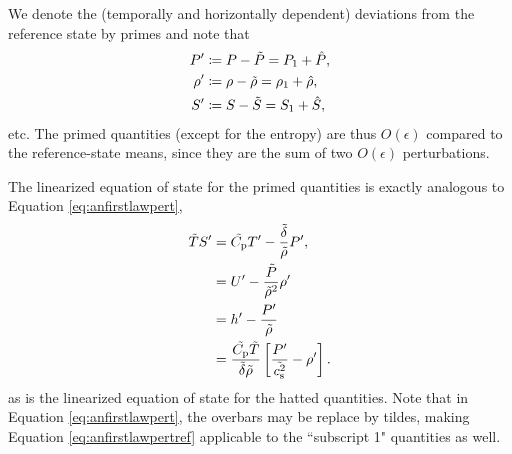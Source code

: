 \documentclass[12pt]{article}
\begin{document}
We denote the (temporally and horizontally dependent) deviations from the reference state by primes and note that 
\begin{align}
	P^\prime & \coloneqq P - \tilde{P} = P_1 + \hat{P},\\
	\rho^\prime & \coloneqq \rho - \tilde{\rho} = \rho_1 + \hat{\rho},\\
	 S^\prime & \coloneqq S -  \tilde{S} =  S_1 + \hat{S},
\end{align}
etc. The primed quantities (except for the entropy) are thus $O(\epsilon)$ compared to the reference-state means, since they are the sum of two $O(\epsilon)$ perturbations. 

The linearized equation of state for the primed quantities is exactly analogous to Equation \eqref{eq:anfirstlawpert},
\begin{subequations}\label{eq:anfirstlawpertref}
	\begin{align}
		\tilde{T} S^\prime &= \tilde{C_{\rm{p}}} T^\prime - \frac{\tilde{\delta}}{\tilde{\rho}} P^\prime,\\
  	&= U^\prime - \frac{\tilde{P}}{\tilde{\rho}^2}\rho^\prime \label{eq:linuref}\\
&= h^\prime - \frac{P^\prime}{\tilde{\rho}}\\
		&= \frac{\tilde{C_{\rm{p}}} \tilde{T}}{\tilde{\delta}\tilde{\rho}}\left[\frac{P^\prime}{\tilde{c_{\rm s}^2}}-\rho^\prime\right].
	\end{align}
\end{subequations}
as is the linearized equation of state for the hatted quantities. Note that in Equation \eqref{eq:anfirstlawpert}, the overbars may be replace by tildes, making Equation \eqref{eq:anfirstlawpertref} applicable to the ``subscript 1" quantities as well. 
\end{document}
